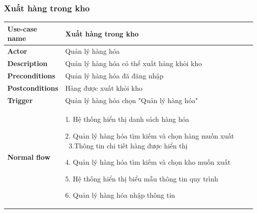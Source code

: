         \subsubsection{Xuất hàng trong kho}
        {
\setlength\extrarowheight{6pt}
            \begin{longtable}{| p{} | p{} |} 
                \hline
                    \textbf{Use-case name} 
                & 
                    Xuất hàng trong kho
                \\
                \hline
                    \textbf{Actor} 
                & 
                    Quản lý hàng hóa
                \\
                \hline
                    \textbf{Description} 
                & 
                    Quản lý hàng hóa có thể xuất hảng khỏi kho
                \\
                \hline
                    \textbf{Preconditions} 
                &
                    Quản lý hàng hóa đã đăng nhập
                \\
                \hline
                    \textbf{Postconditions} 
                & 
                    Hàng được xuất khỏi kho
                \\
                \hline
                    \textbf{Trigger} 
                & 
                    Quản lý hàng hóa chọn "Quản lý hàng hóa"
                \\
                \hline
                \begin{flushleft}
                    \textbf{Normal flow}
                \end{flushleft}
                & 
                1. Hệ thống hiển thị danh sách hàng hóa
                    
                    2. Quản lý hàng hóa tìm kiếm và chọn hàng muốn xuất
                    \
                    3.Thông tin chi tiết hàng được hiển thị
                    
                    4. Quản lý hàng hóa tìm kiếm và chọn kho muốn xuất
                    
                    5. Hệ thống hiển thị biểu mẫu thông tin quy trình
                    
                    6. Quản lý hàng hóa nhập thông tin
                    

\end{longtable}}
